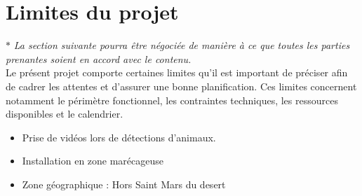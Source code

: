 \section{Limites du projet}

$ \ast $ \textit{La section suivante pourra être négociée de manière à ce que toutes les parties prenantes soient en accord avec le contenu.} \\

Le présent projet comporte certaines limites qu'il est important de préciser afin de cadrer les attentes et d'assurer une bonne planification. Ces limites concernent notamment le périmètre fonctionnel, les contraintes techniques, les ressources disponibles et le calendrier. \\
\begin{itemize}
    \item Prise de vidéos lors de détections d'animaux.
    \item Installation en zone marécageuse
    \item Zone géographique : Hors Saint Mars du desert
\end{itemize}
